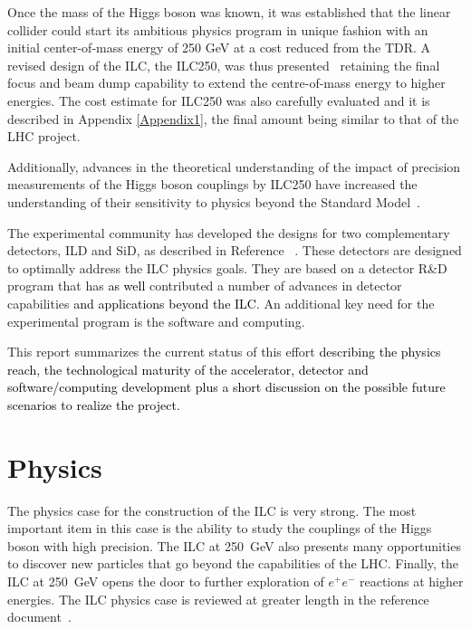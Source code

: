 \documentclass[%
 reprint,
 amsmath,amssymb,
 aps,
]{revtex4-1}
\newcommand{\juan}[1]{\textcolor{black}{{#1}}}
\def\ee{e^+e^-}
\begin{document}

Once the mass of the Higgs boson was known, it was established that the
linear collider could start its ambitious physics program in unique fashion with an initial center-of-mass energy of 250 GeV at a cost reduced from the TDR. A revised design of the ILC, the ILC250, was thus  presented~\cite{Evans:2017rvt} retaining the final focus and beam dump capability to extend the centre-of-mass energy to higher energies.  The cost estimate for ILC250 was also carefully evaluated and it is described in Appendix \ref{Appendix1}, the final amount being similar to that of the LHC project.

Additionally, advances in the theoretical understanding of the impact of precision
measurements of the Higgs boson couplings by ILC250 have increased the understanding
of their sensitivity to physics beyond the Standard Model~\cite{Barklow:2017suo,Fujii:2017vwa}. 

The experimental community has developed the designs for two complementary detectors, ILD and SiD, as described in Reference ~\cite{Behnke:2013lya}. These detectors are designed to optimally address the
ILC physics goals.  They are based on a detector R\&D program that has \juan{as well}
contributed a number of advances in detector capabilities \juan{and applications beyond the ILC}.
An additional key need for the experimental program is the software and computing.

This report summarizes the current status of this effort \juan{describing the physics reach, the technological maturity of the accelerator, detector and software/computing development plus a short discussion on the possible future scenarios to realize the project.} 

\section{\label{sec:phys}Physics}

The physics case for the construction of the ILC is very strong.   The
most important item in this case is the ability to study the couplings
of the Higgs boson with high precision.  The ILC at 250~GeV also
presents many opportunities to discover new particles that go beyond
the capabilities of the LHC.  Finally, the ILC at 250~GeV opens the
door to further exploration of $\ee$ reactions at higher energies. 
The ILC physics case is reviewed at greater length in the reference
document~\cite{ILCforESS}. 
\end{document}
